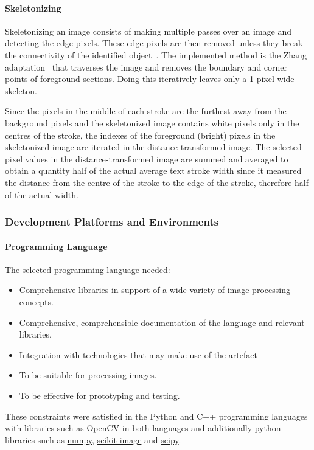 \documentclass[a4paper, 12pt]{report}
\begin{document}
\paragraph{Skeletonizing}
Skeletonizing an image consists of making multiple passes over an image and
detecting the edge pixels. These edge pixels are then removed unless they break
the connectivity of the identified object~\cite{scikit-image}. The implemented
method is the Zhang adaptation~\cite{zhang_suen_1984} that traverses the image
and removes the boundary and corner points of foreground sections. Doing this
iteratively leaves only a 1-pixel-wide skeleton.

Since the pixels in the middle of each stroke are the furthest away from the
background pixels and the skeletonized image contains white pixels only in the
centres of the stroke, the indexes of the foreground (bright) pixels in the
skeletonized image are iterated in the distance-transformed image. The selected
pixel values in the distance-transformed image are summed and averaged to
obtain a quantity half of the actual average text stroke width since it
measured the distance from the centre of the stroke to the edge of the stroke,
therefore half of the actual width.

\subsubsection{Development Platforms and Environments}

\paragraph{Programming Language}
The selected programming language needed:
\begin{itemize}
    \item Comprehensive libraries in support of a wide variety of image processing
          concepts.
    \item Comprehensive, comprehensible documentation of the language and relevant
          libraries.
    \item Integration with technologies that may make use of the artefact
    \item To be suitable for processing images.
    \item To be effective for prototyping and testing.
\end{itemize}

These constraints were satisfied in the Python and C++ programming languages
with libraries such as OpenCV in both languages and additionally python
libraries such as \href{https://numpy.org/}{numpy},
\href{https://scikit-image.org/}{scikit-image} and
\href{https://scikit-image.org/}{scipy}.\par
\end{document}

